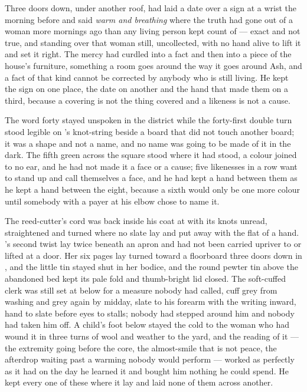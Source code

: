 Three doors down, under another roof,  had laid a date over a sign at a wrist the morning before and said \emph{warm and breathing} where the truth had gone out of a woman more mornings ago than any living person kept count of --- exact and not true, and standing over that woman still, uncollected, with no hand alive to lift it and set it right. The mercy had curdled into a fact and then into a piece of the house's furniture, something a room goes around the way it goes around Ash, and a fact of that kind cannot be corrected by anybody who is still living. He kept the sign on one place, the date on another and the hand that made them on a third, because a covering is not the thing covered and a likeness is not a cause.

The word forty stayed unspoken in the district while the forty-first double turn stood legible on 's knot-string beside a board that did not touch another board; it was a shape and not a name, and no name was going to be made of it in the dark. The fifth green across the square stood where it had stood, a colour joined to no ear, and he had not made it a face or a cause; five likenesses in a row want to stand up and call themselves a face, and he had kept a hand between them as he kept a hand between the eight, because a sixth would only be one more colour until somebody with a payer at his elbow chose to name it.

The reed-cutter's cord was back inside his coat at  with its knots unread, straightened and turned where no slate lay and put away with the flat of a hand. 's second twist lay twice beneath an apron and had not been carried upriver to  or lifted at a door. Her six pages lay turned toward a floorboard three doors down in , and the little tin stayed shut in her bodice, and the round pewter tin above the abandoned bed kept its pale fold and thumb-bright lid closed. The soft-cuffed clerk was still set at  below  for a measure nobody had called, cuff grey from washing and grey again by midday, slate to his forearm with the writing inward, hand to slate before eyes to stalls; nobody had stepped around him and nobody had taken him off. A child's foot below  stayed the cold to the woman who had wound it in three turns of wool and weather to the yard, and the reading of it --- the extremity going before the core, the almost-smile that is not peace, the afterdrop waiting past a warming nobody would perform --- worked as perfectly as it had on the day he learned it and bought him nothing he could spend. He kept every one of these where it lay and laid none of them across another.

